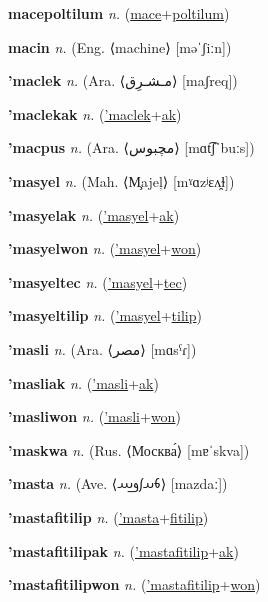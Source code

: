 \textbf{\hypertarget{macepoltilum}{macepoltilum}} \textit{n.} (\hyperlink{mace}{mace}+\allowbreak \hyperlink{poltilum}{poltilum})


\textbf{\hypertarget{macin}{macin}} \textit{n.} (Eng. ⟨machine⟩ [məˈʃiːn])


\textbf{\hypertarget{'maclek}{'maclek}} \textit{n.} (Ara. ⟨{\arabics{}مـشـرِق‎‎}⟩ [maʃreq])


\textbf{\hypertarget{'maclekak}{'maclekak}} \textit{n.} (\hyperlink{'maclek}{'maclek}+\allowbreak \hyperlink{ak}{ak})


\textbf{\hypertarget{'macpus}{'macpus}} \textit{n.} (Ara. ⟨{\arabics{}مچبوس}⟩ [mɑt͡ʃˈbuːs])


\textbf{\hypertarget{'masyel}{'masyel}} \textit{n.} (Mah. ⟨M̧ajeļ⟩ [mˠɑzʲɛʌ̯ɫ])


\textbf{\hypertarget{'masyelak}{'masyelak}} \textit{n.} (\hyperlink{'masyel}{'masyel}+\allowbreak \hyperlink{ak}{ak})


\textbf{\hypertarget{'masyelwon}{'masyelwon}} \textit{n.} (\hyperlink{'masyel}{'masyel}+\allowbreak \hyperlink{won}{won})


\textbf{\hypertarget{'masyeltec}{'masyeltec}} \textit{n.} (\hyperlink{'masyel}{'masyel}+\allowbreak \hyperlink{tec}{tec})


\textbf{\hypertarget{'masyeltilip}{'masyeltilip}} \textit{n.} (\hyperlink{'masyel}{'masyel}+\allowbreak \hyperlink{tilip}{tilip})


\textbf{\hypertarget{'masli}{'masli}} \textit{n.} (Ara. ⟨{\arabics{}مصر}⟩ [mɑsˁɾ])


\textbf{\hypertarget{'masliak}{'masliak}} \textit{n.} (\hyperlink{'masli}{'masli}+\allowbreak \hyperlink{ak}{ak})


\textbf{\hypertarget{'masliwon}{'masliwon}} \textit{n.} (\hyperlink{'masli}{'masli}+\allowbreak \hyperlink{won}{won})


\textbf{\hypertarget{'maskwa}{'maskwa}} \textit{n.} (Rus. ⟨Москва́⟩ [mɐˈskva])


\textbf{\hypertarget{'masta}{'masta}} \textit{n.} (Ave. ⟨{\avestan{}𐬨𐬀𐬰𐬛𐬁}⟩ [mazdaː])


\textbf{\hypertarget{'mastafitilip}{'mastafitilip}} \textit{n.} (\hyperlink{'masta}{'masta}+\allowbreak \hyperlink{fitilip}{fitilip})


\textbf{\hypertarget{'mastafitilipak}{'mastafitilipak}} \textit{n.} (\hyperlink{'mastafitilip}{'mastafitilip}+\allowbreak \hyperlink{ak}{ak})


\textbf{\hypertarget{'mastafitilipwon}{'mastafitilipwon}} \textit{n.} (\hyperlink{'mastafitilip}{'mastafitilip}+\allowbreak \hyperlink{won}{won})


